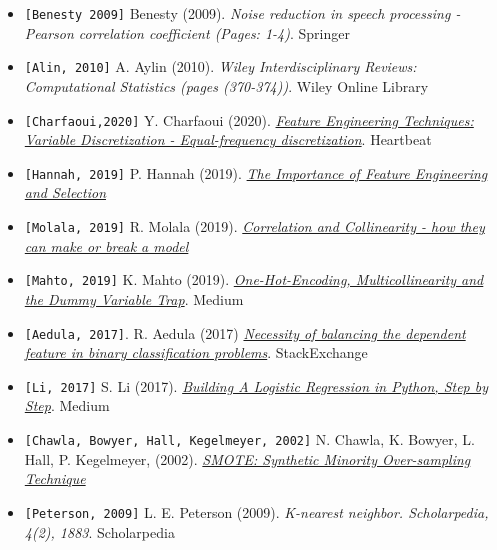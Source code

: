\documentclass[a4paper,12pt]{article}
\begin{document}
\begin{itemize}
        \item \texttt{[Benesty 2009]} Benesty (2009). \textit{Noise reduction in speech processing - Pearson correlation coefficient (Pages: 1-4)}. Springer
        \item \texttt{[Alin, 2010]} A. Aylin (2010). \textit{Wiley Interdisciplinary Reviews: Computational Statistics (pages (370-374))}. Wiley Online Library
        \item \texttt{[Charfaoui,2020]} Y. Charfaoui (2020). \textit{\href{https://heartbeat.fritz.ai/hands-on-with-feature-engineering-techniques-variable-discretization-7deb6a5c6e27}{Feature Engineering Techniques: Variable Discretization - Equal-frequency discretization}}. Heartbeat
        \item \texttt{[Hannah, 2019]} P. Hannah (2019). \textit{\href{https://www.rittmanmead.com/blog/2019/02/the-importance-of-feature-engineering-and-selection/}{The Importance of Feature Engineering and Selection}}
        \item \texttt{[Molala, 2019]} R. Molala (2019). \textit{\href{https://blog.clairvoyantsoft.com/correlation-and-collinearity-how-they-can-make-or-break-a-model-9135fbe6936a}{Correlation and Collinearity - how they can make or break a model}}
        \item \texttt{[Mahto, 2019]} K. Mahto (2019). \textit{\href{https://towardsdatascience.com/one-hot-encoding-multicollinearity-and-the-dummy-variable-trap-b5840be3c41a}{One-Hot-Encoding, Multicollinearity and the Dummy Variable Trap}}. Medium
        \item \texttt{[Aedula, 2017]}. R. Aedula (2017) \textit{\href{https://datascience.stackexchange.com/questions/18516/necessity-of-balancing-positive-negative-examples-in-binary-classification-machi}{Necessity of balancing the dependent feature in binary classification problems}}.  StackExchange
        \item \texttt{[Li, 2017]} S. Li (2017). \textit{\href{https://towardsdatascience.com/building-a-logistic-regression-in-python-step-by-step-becd4d56c9c8}{Building A Logistic Regression in Python, Step by Step}}. Medium
        \item \texttt{[Chawla, Bowyer, Hall, Kegelmeyer, 2002]} N. Chawla, K. Bowyer, L. Hall, P. Kegelmeyer, (2002). \textit{\href{https://arxiv.org/pdf/1106.1813.pdf}{SMOTE: Synthetic Minority Over-sampling Technique}}
        \item \texttt{[Peterson, 2009]} L. E. Peterson (2009). \textit{K-nearest neighbor. Scholarpedia, 4(2), 1883}. Scholarpedia

\end{itemize}
\end{document}
